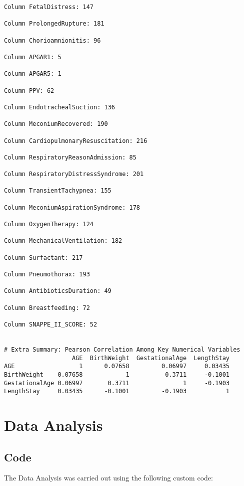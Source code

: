 \documentclass[11pt]{article}
\begin{document}
\begin{Verbatim}[tabsize=4]
Column FetalDistress: 147

Column ProlongedRupture: 181

Column Chorioamnionitis: 96

Column APGAR1: 5

Column APGAR5: 1

Column PPV: 62

Column EndotrachealSuction: 136

Column MeconiumRecovered: 190

Column CardiopulmonaryResuscitation: 216

Column RespiratoryReasonAdmission: 85

Column RespiratoryDistressSyndrome: 201

Column TransientTachypnea: 155

Column MeconiumAspirationSyndrome: 178

Column OxygenTherapy: 124

Column MechanicalVentilation: 182

Column Surfactant: 217

Column Pneumothorax: 193

Column AntibioticsDuration: 49

Column Breastfeeding: 72

Column SNAPPE_II_SCORE: 52


# Extra Summary: Pearson Correlation Among Key Numerical Variables
                   AGE  BirthWeight  GestationalAge  LengthStay
AGE                  1      0.07658         0.06997     0.03435
BirthWeight    0.07658            1          0.3711     -0.1001
GestationalAge 0.06997       0.3711               1     -0.1903
LengthStay     0.03435      -0.1001         -0.1903           1

\end{Verbatim}

\section{Data Analysis} \subsection{Code}The Data Analysis was carried out using the following custom code:
\end{document}
